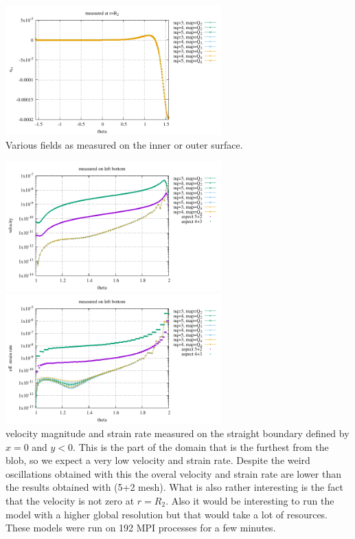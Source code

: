 \begin{center}
\includegraphics[width=8.3cm]{python_codes/fieldstone_152/results/exp2_axisymmetric/err_R2}\\
{\captionfont Various fields as measured on the inner or outer surface.}
\end{center}

\begin{center}
\includegraphics[width=8.3cm]{python_codes/fieldstone_152/results/exp2_axisymmetric/vel_left}
\includegraphics[width=8.3cm]{python_codes/fieldstone_152/results/exp2_axisymmetric/sr2_left}\\
{\captionfont velocity magnitude and strain rate measured on the straight boundary 
defined by $x=0$ and $y<0$. This is the part of the domain that is the furthest from the 
blob, so we expect a very low velocity and strain rate. Despite the weird oscillations
obtained with this \stone the overal velocity and strain rate are lower than the results obtained
with \aspect (5+2 mesh). What is also rather interesting is the fact that the \aspect velocity is
not zero at $r=R_2$. Also it would be interesting to run the \aspect model with a higher global resolution but 
that would take a lot of resources. These models were run on 192 MPI processes for a few minutes.}
\end{center}

